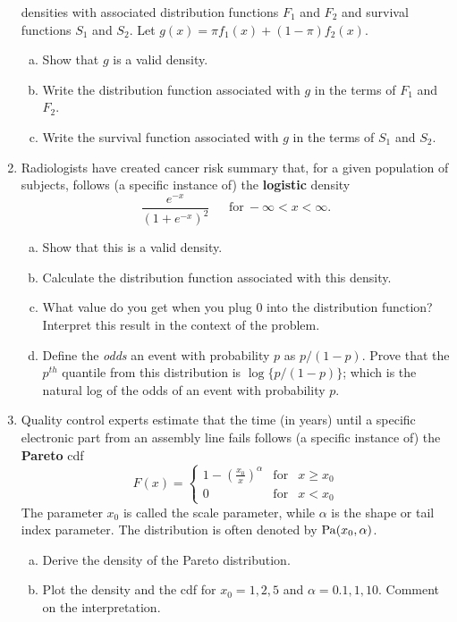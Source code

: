 \documentclass[12pt]{article}
\begin{document}
\begin{enumerate}[Problem 1.]
  densities with associated distribution functions $F_1$ and $F_2$ and
  survival functions $S_1$ and $S_2$. Let $g(x) = \pi f_1(x) + (1 - \pi)f_2(x)$.
    \begin{enumerate}[a.]
    \item Show that $g$ is a valid density.
    \item Write the distribution function associated with $g$ in the terms of
    $F_1$ and $F_2$.
    \item Write the survival function associated with $g$ in the terms of $S_1$ and $S_2$.
    \end{enumerate}
\item  Radiologists have created cancer risk summary that, for a given
  population of subjects, follows (a specific instance of) the {\bf logistic} density
  $$
  \frac{e^{-x}}{(1 + e^{-x})^2} ~~~~~~~\mbox{for}~ -\infty < x < \infty.
  $$
  \begin{enumerate}[a.]
  \item Show that this is a valid density.
  \item Calculate the distribution function associated with this density.
  \item What value do you get when you plug $0$ into the distribution function? Interpret this
    result in the context of the problem.
  \item Define the {\em odds} an event with probability $p$
    as $p / (1 - p)$. Prove that the $p^{th}$ quantile from this
    distribution is $\log\{p / (1 - p)\}$; which is the natural log of
    the odds of an event with probability $p$.
  \end{enumerate}
\item Quality control experts estimate that the time (in years) until a specific electronic
  part from an assembly line fails follows (a specific instance of) the {\bf Pareto}
  cdf
$$
F(x)=\left\{
\begin{array}{lll}
1-\left(\frac{x_0}{x}\right )^\alpha &\mbox{for}& x\geq x_0\\
0&\mbox{for}& x< x_0 \end{array}\right.
$$
The parameter $x_0$ is called the scale parameter, while $\alpha$ is
the shape or tail index parameter. The distribution is often denoted
by ${\rm Pa}(x_0,\alpha)$.
\begin{enumerate}[a.]
\item Derive the density of the Pareto distribution.
\item Plot the density and the cdf for $x_0=1,2,5$ and
$\alpha=0.1,1,10$. Comment on the interpretation.

\end{enumerate}
\end{enumerate}
\end{document}
